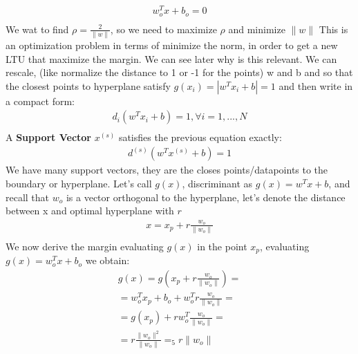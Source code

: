 \documentclass[12pt]{book}
\begin{document}
\begin{equation}
\begin{aligned}
	w_o^Tx + b_o = 0 \\
\end{aligned}
\end{equation}
\newline
We wat to find $\rho = \frac{2}{\|w\|}$, so we need to maximize $\rho$ and minimize $\|w\|$
This is an optimization problem in terms of minimize the norm, in order to get a new LTU that maximize the margin. We can see later why is this relevant.
\newline\newline
We can rescale, (like normalize the distance to 1 or -1 for the points) w and b and so that the closest points to hyperplane satisfy $g(x_i) = |w^Tx_i + b| = 1$ and then write in a compact form:
\begin{equation}
\begin{aligned}
	d_i(w^Tx_i + b) = 1, \forall i = 1,...,N  \\
\end{aligned}
\end{equation}
\newline
A \textbf{Support Vector} $x^{(s)}$ satisfies the previous equation exactly:
\begin{equation}
\begin{aligned}
	d^{(s)}(w^Tx^{(s)} + b) = 1
\end{aligned}
\end{equation}
We have many support vectors, they are the closes points/datapoints to the boundary or hyperplane.\newline
Let's call $g(x)$, discriminant as $g(x) = w^Tx + b$, and recall that $w_o$ is a vector orthogonal to the hyperplane, let's denote the distance between x and optimal hyperplane with $r$
\begin{equation}
\begin{aligned}
	x = x_p + r\frac{w_o}{\|w_o\|} \\
\end{aligned}
\end{equation}
\newline
We now derive the margin evaluating $g(x)$ in the point $x_p$, evaluating $g(x) = w_o^Tx + b_o$ we obtain: 
\begin{equation}
\begin{aligned}
	g(x) = g(x_p + r\frac{w_o}{\|w_o\|}) = \\
	= w_{o}^T x_p + b_o + w_o^T r \frac{w_o}{\|w_o\|} = \\
	= g(x_p) + rw_o^T \frac{w_o}{\|w_o\|} = \\
	= r\frac{\|w_o\|^2}{\|w_o\|} =_5 r\|w_o\|
\end{aligned}
\end{equation}
\end{document}
